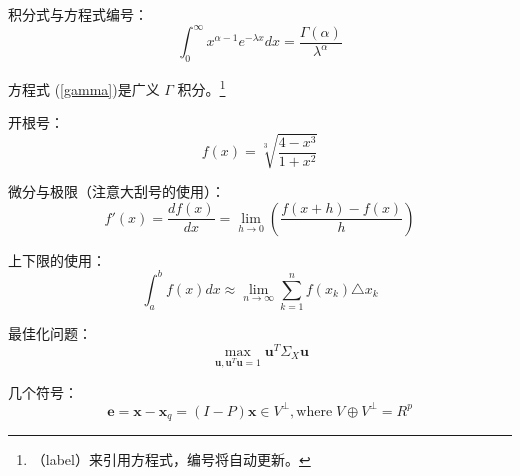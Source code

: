   积分式与方程式编号：
  \begin{equation}\label{gamma}%
  \int^\infty_0 x^{\alpha-1}e^{-\lambda x} dx = \frac{\Gamma(\alpha)}{\lambda^{\alpha}}
  \end{equation}
  
  方程式 (\ref{gamma})是广义 $\Gamma$ 积分。\footnote{（label）来引用方程式，编号将自动更新。}
  
  开根号：
  $$f(x)=\sqrt[3]{\frac {\displaystyle 4-x^{3}}{\displaystyle 1+x^{2}}}$$
  
  微分与极限（注意大刮号的使用）：
  $$f'(x)=\frac{df(x)}{dx}=\lim_{h\rightarrow 0}\left(\frac{f(x+h)-f(x)}{h}\right)$$
  
  上下限的使用：
  $$\int_a^b f(x) dx \approx \lim_{n\rightarrow \infty}\sum_{k=1}^n f(x_k)\triangle x_k$$
  
  最佳化问题：
  $$\max_{\mathbf{u},\mathbf{u}^T\mathbf{u}=1} \mathbf{u}^T\Sigma_X\mathbf{u}$$
  
  几个符号：
  $$\mathbf{e}=\mathbf{x}-\mathbf{x}_q=(I-P)\mathbf{x} \in V^{\perp}, \mbox{where}\; V\oplus V^{\perp}=R^p $$


